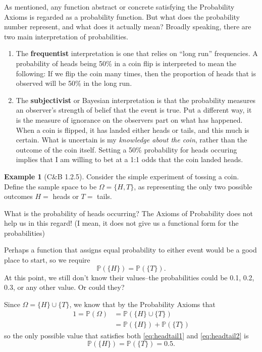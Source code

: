 \documentclass[
]{book}
\newcommand{\bbP}{\mathbb{P}}
\theoremstyle{definition}
\theoremstyle{definition}
\newtheorem{example}{Example}[chapter]
\theoremstyle{definition}
\theoremstyle{definition}
\theoremstyle{remark}
\begin{document}
As mentioned, any function abstract or concrete satisfying the Probability Axioms is regarded as a probability function.
But what does the probability number represent, and what does it actually mean?
Broadly speaking, there are two main interpretation of probabilities.

\begin{enumerate}
\def\labelenumi{\arabic{enumi}.}
\item
  The \textbf{frequentist} interpretation is one that relies on ``long run'' frequencies. A probability of heads being 50\% in a coin flip is interpreted to mean the following: If we flip the coin many times, then the proportion of heads that is observed will be 50\% in the long run.
\item
  The \textbf{subjectivist} or Bayesian interpretation is that the probability measures an observer's strength of belief that the event is true. Put a different way, it is the measure of ignorance on the observers part on what has happened. When a coin is flipped, it has landed either heads or tails, and this much is certain. What is uncertain is my \emph{knowledge about the coin}, rather than the outcome of the coin itself. Setting a 50\% probability for heads occuring implies that I am willing to bet at a 1:1 odds that the coin landed heads.
\end{enumerate}

\begin{example}[C\&B 1.2.5]
Consider the simple experiment of tossing a coin.
Define the sample space to be \(\Omega=\{H,T\}\), as representing the only two possible outcomes \(H=\) heads or \(T=\) tails.

What is the probability of heads occurring?
The Axioms of Probability does not help us in this regard! (I mean, it does not give us a functional form for the probabilities)

Perhaps a function that assigns equal probability to either event would be a good place to start, so we require
\begin{equation}
\bbP(\{H\})=\bbP(\{T\}). \label{eq:headtail1}  
\end{equation}
At this point, we still don't know their values--the probabilities could be 0.1, 0.2, 0.3, or any other value.
Or could they?

Since \(\Omega = \{H\} \cup \{T\}\), we know that by the Probability Axioms that
\begin{align}
1 = \bbP(\Omega) 
&= \bbP\left( \{H\} \cup \{T\} \right) \nonumber \\
&= \bbP(\{H\}) + \bbP(\{T\}) \label{eq:headtail2}
\end{align}
so the only possible value that satisfies both \eqref{eq:headtail1} and \eqref{eq:headtail2} is
\[
\bbP(\{H\})=\bbP(\{T\}) = 0.5.
\]
\end{example}
\end{document}
